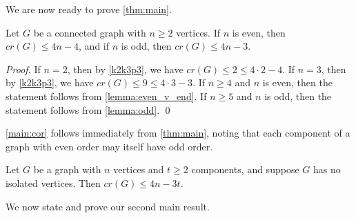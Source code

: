 \documentclass[runningheads,orivec]{llncs}
\begin{document}
We are now ready to prove \autoref{thm:main}.

\begin{theorem}
    \label{thm:main}
    Let $G$ be a connected graph with $n \geq 2$ vertices. If $n$ is even, then $cr(G) \leq 4n - 4$, and if $n$ is odd, then $cr(G) \leq 4n - 3$.
\end{theorem}

\begin{proof}
    If $n = 2$, then by \autoref{k2k3p3}, we have $cr(G)\leq 2\leq 4\cdot 2 - 4$. 
    If $n = 3$, then by \autoref{k2k3p3}, we have $cr(G) \leq 9 \leq 4 \cdot 3 - 3$.
    If $n \geq 4$ and $n$ is even, then the statement follows from \autoref{lemma:even_v_end}.  
    If $n \geq 5$ and $n$ is odd, then the statement follows from \autoref{lemma:odd}. 
    \qed
\end{proof}

\autoref{main:cor} follows immediately from \autoref{thm:main}, noting that each component of a graph with even order may itself have odd order.

\begin{corollary}
    \label{main:cor}
    Let $G$ be a graph with $n$ vertices and $t \geq 2$ components, and suppose $G$ has no isolated vertices. Then $cr(G) \leq 4n - 3t$.
\end{corollary}

We now state and prove our second main result.
\end{document}
